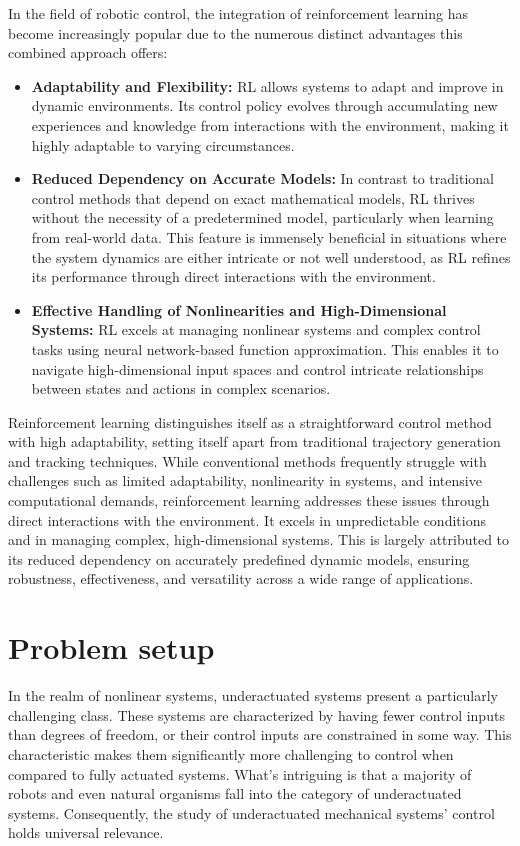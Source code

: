 In the field of robotic control, the integration of reinforcement learning has become increasingly popular due to the numerous distinct advantages this combined approach offers:

\begin{itemize}
    \item \textbf{Adaptability and Flexibility:}
    RL allows systems to adapt and improve in dynamic environments. Its control policy evolves through accumulating new experiences and knowledge from interactions with the environment, making it highly adaptable to varying circumstances.

    \item \textbf{Reduced Dependency on Accurate Models:}
    In contrast to traditional control methods that depend on exact mathematical models, RL thrives without the necessity of a predetermined model, particularly when learning from real-world data. This feature is immensely beneficial in situations where the system dynamics are either intricate or not well understood, as RL refines its performance through direct interactions with the environment.

    \item \textbf{Effective Handling of Nonlinearities and High-Dimensional Systems:}
    RL excels at managing nonlinear systems and complex control tasks using neural network-based function approximation. This enables it to navigate high-dimensional input spaces and control intricate relationships between states and actions in complex scenarios.
\end{itemize}

Reinforcement learning distinguishes itself as a straightforward control method with high adaptability, setting itself apart from traditional trajectory generation and tracking techniques. While conventional methods frequently struggle with challenges such as limited adaptability, nonlinearity in systems, and intensive computational demands, reinforcement learning addresses these issues through direct interactions with the environment. It excels in unpredictable conditions and in managing complex, high-dimensional systems. This is largely attributed to its reduced dependency on accurately predefined dynamic models, ensuring robustness, effectiveness, and versatility across a wide range of applications.


\section{Problem setup}
In the realm of nonlinear systems, underactuated systems\cite{liu2013survey} present a particularly challenging class. These systems are characterized by having fewer control inputs than degrees of freedom, or their control inputs are constrained in some way. This characteristic makes them significantly more challenging to control when compared to fully actuated systems. What's intriguing is that a majority of robots and even natural organisms fall into the category of underactuated systems. Consequently, the study of underactuated mechanical systems' control holds universal relevance.

